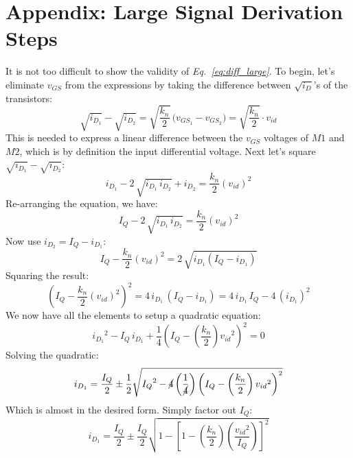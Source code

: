 \section{Appendix: Large Signal Derivation Steps} \label{sec:derive_diff_large}
It is not too difficult to show the validity of \emph{Eq.~\ref{eq:diff_large}}.  To begin, let's eliminate $v_{GS}$ from the expressions by taking the difference between $\sqrt{i_D}$'s of the transistors:
    \begin{equation}
        \sqrt{i_{D_1}} - \sqrt{i_{D_2}}
        = \sqrt{\frac{k_n}{2}}\,\big(v_{GS_1} - v_{GS_2}\big)
        = \sqrt{\frac{k_n}{2}} \cdot v_{id}
    \end{equation}
This is needed to express a linear difference between the $v_{GS}$ voltages of $M1$ and $M2$, which is by definition the input differential voltage.  Next let's square $\sqrt{i_{D_1}} - \sqrt{i_{D_2}}$:
    \begin{equation}
        i_{D_1} - 2\,\sqrt{i_{D_1}\,i_{D_2}} + i_{D_2}
        = \frac{k_n}{2}{\left(v_{id}\right)}^2
    \end{equation}
Re-arranging the equation, we have:
    \begin{equation}
        I_Q - 2\,\sqrt{i_{D_1}\,i_{D_2}}
        = \frac{k_n}{2}{\left(v_{id}\right)}^2
    \end{equation}
Now use $i_{D_2} = I_Q - i_{D_1}$:
    \begin{equation}
        I_Q - \frac{k_n}{2}{\left(v_{id}\right)}^2 = 2\,\sqrt{i_{D_1}(I_Q - i_{D_1})}
    \end{equation}
Squaring the result:
    \begin{equation}
        {\left(I_Q - \frac{k_n}{2}{\left(v_{id}\right)}^2\right)}^2
        = 4\,i_{D_1}\,(I_Q - i_{D_1})
        = 4\,i_{D_1}\,I_Q - 4\,{(i_{D_1})}^2
    \end{equation}
We now have all the elements to setup a quadratic equation:
    \begin{equation}
        {i_{D_1}}^2 - I_Q\,i_{D_1} + \frac{1}{4}{\left(I_Q - \left(\frac{k_n}{2}\right){v_{id}}^2\right)}^2 = 0
    \end{equation}
Solving the quadratic:
    \begin{equation}
        i_{D_1} = \frac{I_Q}{2} \pm \frac{1}{2}\sqrt{{I_Q}^2
            - \cancel{4}\left(\frac{1}{\cancel{4}}\right){\left(I_Q - \left(\frac{k_n}{2}\right){v_{id}}^2\right)}^2}
    \end{equation}
Which is almost in the desired form.  Simply factor out $I_Q$:
    \begin{equation}
        i_{D_1} = \frac{I_Q}{2} \pm \frac{I_Q}{2}\sqrt{1 - {\left[1
                    - \left(\frac{k_n}{2}\right) \left(\frac{{v_{id}}^2}{I_Q}\right)\right]}^2}
    \end{equation}
